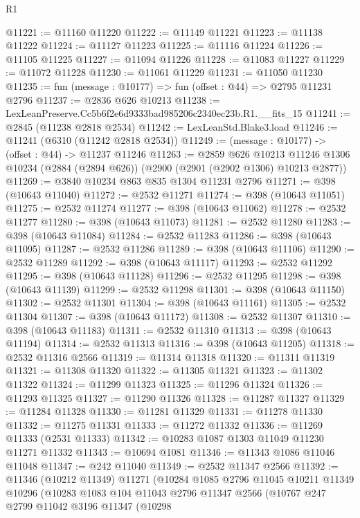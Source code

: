 \begin{lexlean}{R1}
\begin{coremodule}
@11221 := @11160 @11220
@11222 := @11149 @11221
@11223 := @11138 @11222
@11224 := @11127 @11223
@11225 := @11116 @11224
@11226 := @11105 @11225
@11227 := @11094 @11226
@11228 := @11083 @11227
@11229 := @11072 @11228
@11230 := @11061 @11229
@11231 := @11050 @11230
@11235 := fun (message : @10177) => fun (offset : @44) => @2795 @11231 @2796
@11237 := @2836 @626 @10213
@11238 := LexLeanPreserve.Cc5b6f2e6d9333bad985206c2340ec23b.R1.__fits_15
@11241 := @2845 (@11238 @2818 @2534)
@11242 := LexLeanStd.Blake3.load
@11246 := @11241 (@6310 (@11242 @2818 @2534))
@11249 := (message : @10177) -> (offset : @44) -> @11237 @11246
@11263 := @2859
    @626
    @10213
    @11246
    @1306
    @10234
    (@2884 (@2894 @626))
    (@2900 (@2901 (@2902 @1306) @10213 @2877))
@11269 := @3840 @10234 @863 @835 @1304 @11231 @2796
@11271 := @398 (@10643 @11040)
@11272 := @2532 @11271
@11274 := @398 (@10643 @11051)
@11275 := @2532 @11274
@11277 := @398 (@10643 @11062)
@11278 := @2532 @11277
@11280 := @398 (@10643 @11073)
@11281 := @2532 @11280
@11283 := @398 (@10643 @11084)
@11284 := @2532 @11283
@11286 := @398 (@10643 @11095)
@11287 := @2532 @11286
@11289 := @398 (@10643 @11106)
@11290 := @2532 @11289
@11292 := @398 (@10643 @11117)
@11293 := @2532 @11292
@11295 := @398 (@10643 @11128)
@11296 := @2532 @11295
@11298 := @398 (@10643 @11139)
@11299 := @2532 @11298
@11301 := @398 (@10643 @11150)
@11302 := @2532 @11301
@11304 := @398 (@10643 @11161)
@11305 := @2532 @11304
@11307 := @398 (@10643 @11172)
@11308 := @2532 @11307
@11310 := @398 (@10643 @11183)
@11311 := @2532 @11310
@11313 := @398 (@10643 @11194)
@11314 := @2532 @11313
@11316 := @398 (@10643 @11205)
@11318 := @2532 @11316 @2566
@11319 := @11314 @11318
@11320 := @11311 @11319
@11321 := @11308 @11320
@11322 := @11305 @11321
@11323 := @11302 @11322
@11324 := @11299 @11323
@11325 := @11296 @11324
@11326 := @11293 @11325
@11327 := @11290 @11326
@11328 := @11287 @11327
@11329 := @11284 @11328
@11330 := @11281 @11329
@11331 := @11278 @11330
@11332 := @11275 @11331
@11333 := @11272 @11332
@11336 := @11269 @11333 (@2531 @11333)
@11342 := @10283 @1087 @1303 @11049 @11230 @11271 @11332
@11343 := @10694 @1081
@11346 := @11343 @1086 @11046 @11048
@11347 := @242 @11040
@11349 := @2532 @11347 @2566
@11392 := @11346
    (@10212 @11349)
    @11271
    (@10284
      @1085
      @2796
      @11045
      @10211
      @11349
      @10296
      (@10283
        @1083
        @104
        @11043
        @2796
        @11347
        @2566
        (@10767
          @247
          @2799
          @11042
          @3196
          @11347
          (@10298

\end{coremodule}
\end{lexlean}
